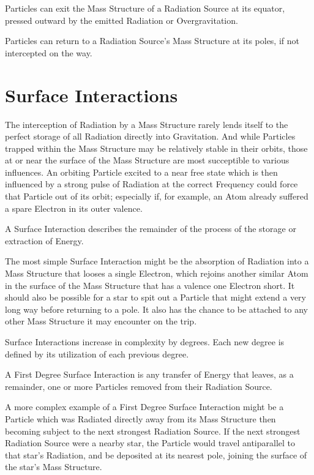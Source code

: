 \documentclass[12pt]{article}
\begin{document}
Particles can exit the Mass Structure of a Radiation Source at its equator, pressed outward by the emitted Radiation or Overgravitation. 

Particles can return to a Radiation Source's Mass Structure at its poles, if not intercepted on the way.







\newpage
\section*{Surface Interactions}

The interception of Radiation by a Mass Structure rarely lends itself to the perfect storage of all Radiation directly into Gravitation. And while Particles trapped within the Mass Structure may be relatively stable in their orbits, those at or near the surface of the Mass Structure are most succeptible to various influences. An orbiting Particle excited to a near free state which is then influenced by a strong pulse of Radiation at the correct Frequency could force that Particle out of its orbit; especially if, for example, an Atom already suffered a spare Electron in its outer valence.

\begin{defn}
   A Surface Interaction describes the remainder of the process of the storage or extraction of Energy.
\end{defn}

The most simple Surface Interaction might be the absorption of Radiation into a Mass Structure that looses a single Electron, which rejoins another similar Atom in the surface of the Mass Structure that has a valence one Electron short. It should also be possible for a star to spit out a Particle that might extend a very long way before returning to a pole. It also has the chance to be attached to any other Mass Structure it may encounter on the trip.

Surface Interactions increase in complexity by degrees. Each new degree is defined by its utilization of each previous degree.

\begin{thm}
   A First Degree Surface Interaction is any transfer of Energy that leaves, as a remainder, one or more Particles removed from their Radiation Source.
\end{thm}

A more complex example of a First Degree Surface Interaction might be a Particle which was Radiated directly away from its Mass Structure then becoming subject to the next strongest Radiation Source. If the next strongest Radiation Source were a nearby star, the Particle would travel antiparallel to that star's Radiation, and be deposited at its nearest pole, joining the surface of the star's Mass Structure. 
\end{document}
